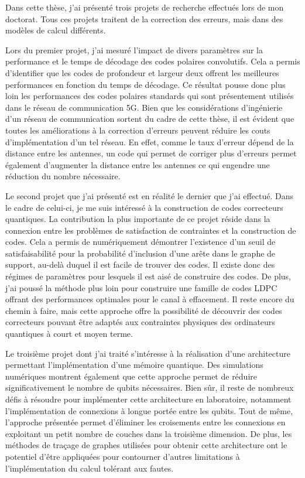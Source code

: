 \begin{comment}
\end{comment}

\Conclusion %

Dans cette thèse,
j'ai présenté trois projets de recherche effectués lors de mon doctorat.
Tous ces projets traitent de la correction des erreurs,
mais dans des modèles de calcul différents.

Lors du premier projet,
j'ai mesuré l'impact de divers paramètres sur la performance et le temps de décodage
des codes polaires convolutifs.
Cela a permis d'identifier que les codes de profondeur et largeur deux offrent les
meilleures performances en fonction du temps de décodage.
Ce résultat pousse donc plus loin les performances des codes polaires standards
qui sont présentement utilisés dans le réseau de communication 5G.
Bien que les considérations d'ingénierie d'un réseau de communication sortent du cadre de cette thèse,
il est évident que toutes les améliorations à la correction d'erreurs peuvent réduire les 
couts d'implémentation d'un tel réseau.
En effet,
comme le taux d'erreur dépend de la distance entre les antennes,
un code qui permet de corriger plus d'erreurs permet également d'augmenter la distance
entre les antennes ce qui engendre une réduction du nombre nécessaire.

Le second projet que j'ai présenté est en réalité le dernier que j'ai effectué.
Dans le cadre de celui-ci,
je me suis intéressé à la construction de codes correcteurs quantiques.
La contribution la plus importante de ce projet réside dans la connexion
entre les problèmes de satisfaction de contraintes et la construction de codes.
Cela a permis de numériquement démontrer l'existence d'un seuil de satisfaisabilité
pour la probabilité d'inclusion d'une arête dans le graphe de support,
au-delà duquel il est facile de trouver des codes.
Il existe donc des régimes de paramètres pour lesquels il est aisé de construire des codes.
De plus,
j'ai poussé la méthode plus loin pour construire une famille de codes LDPC offrant des 
performances optimales pour le canal à effacement.
Il reste encore du chemin à faire,
mais cette approche offre la possibilité de découvrir des codes correcteurs pouvant être
adaptés aux contraintes physiques des ordinateurs quantiques à court et moyen terme.

Le troisième projet dont j'ai traité s'intéresse à la réalisation d'une architecture
permettant l'implémentation d'une mémoire quantique.
Des simulations numériques montrent également que cette approche permet de réduire significativement
le nombre de qubits nécessaires.
Bien sûr,
il reste de nombreux défis à résoudre pour implémenter cette architecture en laboratoire,
notamment l'implémentation de connexions à longue portée entre les qubits.
Tout de même,
l'approche présentée permet d'éliminer les croisements entre les connexions en exploitant
un petit nombre de couches dans la troisième dimension.
De plus,
les méthodes de traçage de graphes utilisées pour obtenir cette architecture 
ont le potentiel d'être appliquées pour contourner d'autres limitations à l'implémentation
du calcul tolérant aux fautes.

